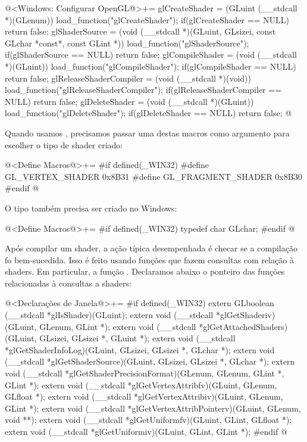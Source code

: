 \iniciocodigo
@<Windows: Configurar OpenGL@>+=
glCreateShader = (GLuint (__stdcall *)(GLenum)) load_function("glCreateShader");
if(glCreateShader == NULL)
  return false;
glShaderSource = (void (__stdcall *)(GLuint, GLsizei, const GLchar *const*,
                                     const GLint *))
                 load_function("glShaderSource");
if(glShaderSource == NULL)
  return false;
glCompileShader = (void (__stdcall *)(GLuint)) load_function("glCompileShader");
if(glCompileShader == NULL)
  return false;
glReleaseShaderCompiler = (void (__stdcall *)(void))
                             load_function("glReleaseShaderCompiler");
if(glReleaseShaderCompiler == NULL)
  return false;
glDeleteShader = (void (__stdcall *)(GLuint)) load_function("glDeleteShader");
if(glDeleteShader == NULL)
  return false;
@
\fimcodigo

Quando usamos , precisamos passar uma
destas macros como argumento para escolher o tipo de shader criado:

\iniciocodigo
@<Define Macros@>+=
#if defined(_WIN32)
#define GL_VERTEX_SHADER          0x8B31
#define GL_FRAGMENT_SHADER        0x8B30
#endif
@
\fimcodigo

O tipo  também precisa ser criado no Windows:

\iniciocodigo
@<Define Macros@>+=
#if defined(_WIN32)
typedef char  GLchar;
#endif
@
\fimcodigo

Após compilar um shader, a ação típica desempenhada é checar se a
compilação fo bem-sucedida. Isso é feito usando funções que fazem
consultas com relação à shaders. Em particular, a
função . Declaramos abaixo o ponteiro das
funções relacionadas à consultas a shaders:

\iniciocodigo
@<Declarações de Janela@>+=
#if defined(_WIN32)
extern GLboolean (__stdcall *glIsShader)(GLuint);
extern void (__stdcall *glGetShaderiv)(GLuint, GLenum, GLint *);
extern void (__stdcall *glGetAttachedShaders)(GLuint, GLsizei, GLsizei *,
                                              GLuint *);
extern void (__stdcall *glGetShaderInfoLog)(GLuint, GLsizei, GLsizei *, GLchar *);
extern void (__stdcall *glGetShaderSource)(GLuint, GLsizei, GLsizei *, GLchar *);
extern void (__stdcall *glGetShaderPrecisionFormat)(GLenum, GLenum, GLint *,
                                                    GLint *);
extern void (__stdcall *glGetVertexAttribfv)(GLuint, GLenum, GLfloat *);
extern void (__stdcall *glGetVertexAttribiv)(GLuint, GLenum, GLint *);
extern void (__stdcall *glGetVertexAttribPointerv)(GLuint, GLenum, void **);
extern void (__stdcall *glGetUniformfv)(GLuint, GLint, GLfloat *);
extern void (__stdcall *glGetUniformiv)(GLuint, GLint, GLint *);
#endif
@
\fimcodigo

